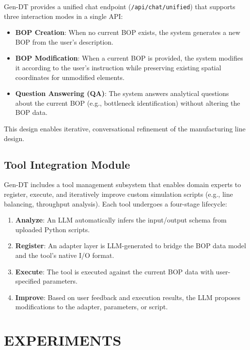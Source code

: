 Gen-DT provides a unified chat endpoint (\texttt{/api/chat/unified}) that supports three interaction modes in a single API:

\begin{itemize}
    \item \textbf{BOP Creation}: When no current BOP exists, the system generates a new BOP from the user's description.
    \item \textbf{BOP Modification}: When a current BOP is provided, the system modifies it according to the user's instruction while preserving existing spatial coordinates for unmodified elements.
    \item \textbf{Question Answering (QA)}: The system answers analytical questions about the current BOP (e.g., bottleneck identification) without altering the BOP data.
\end{itemize}

This design enables iterative, conversational refinement of the manufacturing line design.

\subsection{Tool Integration Module}

Gen-DT includes a tool management subsystem that enables domain experts to register, execute, and iteratively improve custom simulation scripts (e.g., line balancing, throughput analysis).
Each tool undergoes a four-stage lifecycle:

\begin{enumerate}
    \item \textbf{Analyze}: An LLM automatically infers the input/output schema from uploaded Python scripts.
    \item \textbf{Register}: An adapter layer is LLM-generated to bridge the BOP data model and the tool's native I/O format.
    \item \textbf{Execute}: The tool is executed against the current BOP data with user-specified parameters.
    \item \textbf{Improve}: Based on user feedback and execution results, the LLM proposes modifications to the adapter, parameters, or script.
\end{enumerate}

\section{EXPERIMENTS}
\label{sec:experiments}

